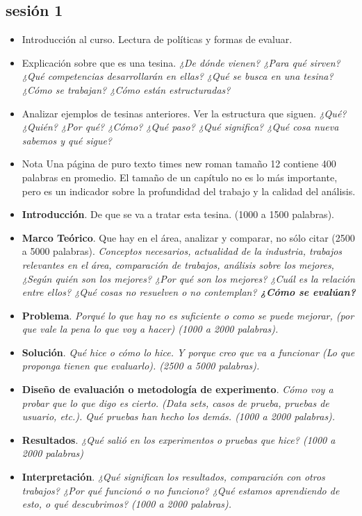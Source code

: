 \documentclass[letterpaper, 10 pt, conference]{ieeeconf}  %
\begin{document}
\subsection{sesión 1}
	\begin{itemize}
		\item Introducción al curso.  Lectura de políticas y formas de evaluar.
		\item Explicación sobre que es una tesina. \emph{¿De dónde vienen? ¿Para qué sirven? ¿Qué competencias desarrollarán en ellas? ¿Qué se busca en una tesina? ¿Cómo se trabajan? ¿Cómo están estructuradas?}
		\item Analizar ejemplos de tesinas anteriores. Ver la estructura que siguen.  \emph{¿Qué? ¿Quién? ¿Por qué? ¿Cómo? ¿Qué paso? ¿Qué significa? ¿Qué cosa nueva sabemos y qué sigue?}
		\item Nota Una página de puro texto times new roman tamaño 12 contiene 400 palabras en promedio. El tamaño de un capítulo no es lo más importante, pero es un indicador sobre la profundidad del trabajo y la calidad del análisis.
		\item \textbf{Introducción}. De que se va a tratar esta tesina. (1000 a 1500 palabras).
		\item \textbf{Marco Teórico}. Que hay en el área, analizar y comparar, no sólo citar (2500 a 5000 palabras). \emph{Conceptos necesarios, actualidad de la industria, trabajos relevantes en el área, comparación de trabajos, análisis sobre los mejores, ¿Según quién son los mejores? ¿Por qué son los mejores? ¿Cuál es la relación entre ellos? ¿Qué cosas no resuelven o no contemplan? \textbf{¿Cómo se evalúan?}}
		\item \textbf{Problema}. \emph{Porqué lo que hay no es suficiente o como se puede mejorar, (por que vale la pena lo que voy a hacer) (1000 a 2000 palabras).}
		\item \textbf{Solución}. \emph{Qué hice o cómo lo hice. Y porque creo que va a funcionar (Lo que proponga tienen que evaluarlo).  (2500 a 5000 palabras).}
		\item \textbf{Diseño de evaluación o metodología de experimento}. \emph{Cómo voy a probar que lo que digo es cierto. (Data sets, casos de prueba, pruebas de usuario, etc.).  Qué pruebas han hecho los demás. (1000 a 2000 palabras).}
		\item \textbf{Resultados}. \emph{¿Qué salió en los experimentos o pruebas que hice?  (1000 a 2000 palabras)}
		\item \textbf{Interpretación}. \emph{¿Qué significan los resultados, comparación con otros trabajos? ¿Por qué funcionó o no funciono? ¿Qué estamos aprendiendo de esto, o qué descubrimos? (1000 a 2000 palabras).}

\end{itemize}
\end{document}
